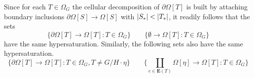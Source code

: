 \documentclass[a4paper,10pt
 ,draft
]{article}%
\begin{document}
%



\begin{remark}\label{DUMBHYPER REM}
Since for each $T \in \Omega_G$ the cellular decomposition of 
$\partial \Omega[T]$ is built by attaching boundary inclusions 
$\partial \Omega[S] \to \Omega[S]$ with $|S_{\**}|<|T_{\**}|$, it readily follows that the sets
\[
\{\partial \Omega[T] \to \Omega[T] \colon T \in \Omega_G\}
\qquad
\{\emptyset \to \Omega[T] \colon T \in \Omega_G\}
\]
have the same hypersaturation. Similarly, the following sets also have the same hypersaturation.
\[
\{\partial \Omega[T] \to \Omega[T] \colon T \in \Omega_G,T \neq G/H \cdot \eta\}
\qquad
\{ \coprod_{e \in \boldsymbol{E}(T)} \Omega[\eta] \to \Omega[T] \colon T \in \Omega_G\} 
\]
\end{remark}
\end{document}
